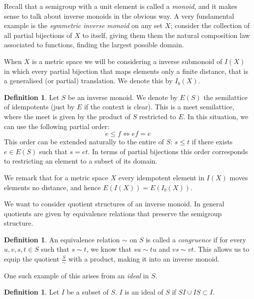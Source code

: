 \documentclass[11pt]{amsart}
\theoremstyle{plain}
\theoremstyle{definition}%
\newtheorem{definition}[theorem]{Definition}%
\theoremstyle{remark}%
\begin{document}
Recall that a semigroup with a unit element is called a \textit{monoid}, and it makes sense to talk about inverse monoids in the obvious way. A very fundamental example is the \textit{symmetric inverse monoid} on any set $X$; consider the collection of all partial bijections of $X$ to itself, giving them them the natural composition law associated to functions, finding the largest possible domain.

When $X$ is a metric space we will be considering a inverse submonoid of $I(X)$ in which every partial bijection that maps elements only a finite distance, that is a generalised (or partial) translation. We denote this by $I_{b}(X)$.

\begin{definition}
Let $S$ be an inverse monoid. We denote by $E(S)$ the semilattice of idempotents (just by $E$ if the context is clear). This is a meet semilattice, where the meet is given by the product of $S$ restricted to $E$. In this situation, we can use the following partial order:
\begin{equation*}
e \leq f \Leftrightarrow ef=e
\end{equation*}
This order can be extended naturally to the entire of $S$: $s \leq t$ if there exists $e \in E(S)$ such that $s=et$. In terms of partial bijections this order corresponds to restricting an element to a subset of its domain.
\end{definition}

We remark that for a metric space $X$ every idempotent element in $I(X)$ moves elements no distance, and hence $E(I(X))=E(I_{b}(X))$.

We want to consider quotient structures of an inverse monoid. In general quotients are given by equivalence relations that preserve the semigroup structure.

\begin{definition}
An equivalence relation $\sim$ on $S$ is called a \textit{congruence} if for every $u,v,s,t \in S$ such that $s \sim t$, we know that $su\sim tu$ and $vs \sim vt$. This allows us to equip the quotient $\frac{S}{\sim}$ with a product, making it into an inverse monoid.
\end{definition}

One such example of this arises from an \textit{ideal} in $S$.

\begin{definition}
Let $I$ be a subset of $S$. $I$ is an ideal of $S$ if $SI \cup IS \subset I$.
\end{definition}
\end{document}
